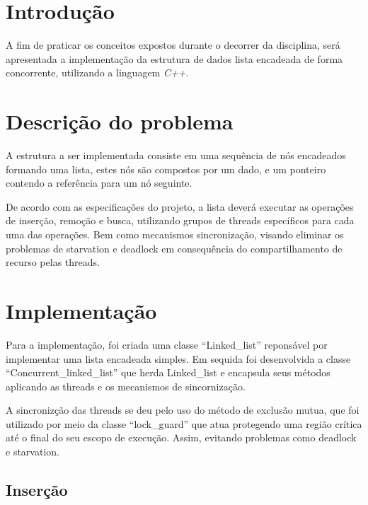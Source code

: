 \documentclass[
	article,			%
	11pt,				%
	oneside,			%
	a4paper,			%
	english,			%
	brazil,				%
	sumario=tradicional
	]{abntex2}
\begin{document}
\frenchspacing

\maketitle


\section{Introdução}

A fim de praticar os conceitos expostos durante o decorrer da disciplina, será
apresentada a implementação da estrutura de dados lista encadeada de forma
concorrente, utilizando a linguagem \textit{C++}.

\section{Descrição do problema}

A estrutura a ser implementada consiste em uma sequência de nós
encadeados formando uma lista, estes nós são compostos por um dado, e
um ponteiro contendo a referência para um nó seguinte.

De acordo com as especificações do projeto, a lista deverá executar as
operações de inserção, remoção e busca, utilizando grupos de threads
específicos para cada uma das operações. Bem como mecanismos
sincronização, visando eliminar os problemas de starvation e deadlock em
consequência do compartilhamento de recurso pelas threads.

\section{Implementação}
Para a implementação, foi criada uma classe ``Linked\_list'' reponsável por
implementar uma lista encadeada simples. Em sequida foi desenvolvida a classe
``Concurrent\_linked\_list'' que herda Linked\_list e encapsula seus
métodos aplicando as threads e os mecanismos de sincornização.

A sincronizção das threads se deu pelo uso do método de exclusão mutua,
que foi utilizado por meio da classe ``lock\_guard'' que atua
protegendo uma região crítica até o final do seu escopo de execução.
Assim, evitando problemas como deadlock e starvation.

\subsection{Inserção}
\end{document}
